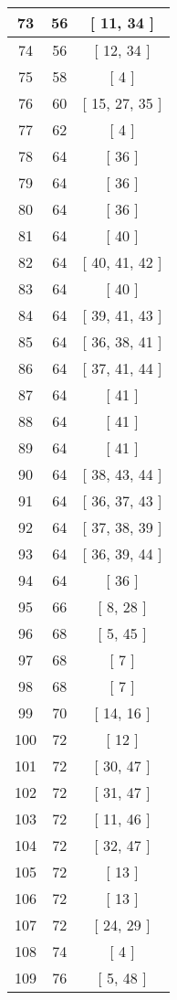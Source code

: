 \begin{center}
\begin{longtable}[H]{|| c c c ||}
\hline
73 & 56 & [ 11, 34 ] \\ 
\hline
74 & 56 & [ 12, 34 ] \\ 
\hline
75 & 58 & [ 4 ] \\ 
\hline
76 & 60 & [ 15, 27, 35 ] \\ 
\hline
77 & 62 & [ 4 ] \\ 
\hline
78 & 64 & [ 36 ] \\ 
\hline
79 & 64 & [ 36 ] \\ 
\hline
80 & 64 & [ 36 ] \\ 
\hline
81 & 64 & [ 40 ] \\ 
\hline
82 & 64 & [ 40, 41, 42 ] \\ 
\hline
83 & 64 & [ 40 ] \\ 
\hline
84 & 64 & [ 39, 41, 43 ] \\ 
\hline
85 & 64 & [ 36, 38, 41 ] \\ 
\hline
86 & 64 & [ 37, 41, 44 ] \\ 
\hline
87 & 64 & [ 41 ] \\ 
\hline
88 & 64 & [ 41 ] \\ 
\hline
89 & 64 & [ 41 ] \\ 
\hline
90 & 64 & [ 38, 43, 44 ] \\ 
\hline
91 & 64 & [ 36, 37, 43 ] \\ 
\hline
92 & 64 & [ 37, 38, 39 ] \\ 
\hline
93 & 64 & [ 36, 39, 44 ] \\ 
\hline
94 & 64 & [ 36 ] \\ 
\hline
95 & 66 & [ 8, 28 ] \\ 
\hline
96 & 68 & [ 5, 45 ] \\ 
\hline
97 & 68 & [ 7 ] \\ 
\hline
98 & 68 & [ 7 ] \\ 
\hline
99 & 70 & [ 14, 16 ] \\ 
\hline
100 & 72 & [ 12 ] \\ 
\hline
101 & 72 & [ 30, 47 ] \\ 
\hline
102 & 72 & [ 31, 47 ] \\ 
\hline
103 & 72 & [ 11, 46 ] \\ 
\hline
104 & 72 & [ 32, 47 ] \\ 
\hline
105 & 72 & [ 13 ] \\ 
\hline
106 & 72 & [ 13 ] \\ 
\hline
107 & 72 & [ 24, 29 ] \\ 
\hline
108 & 74 & [ 4 ] \\ 
\hline
109 & 76 & [ 5, 48 ] \\ 

\end{longtable}
\end{center}
